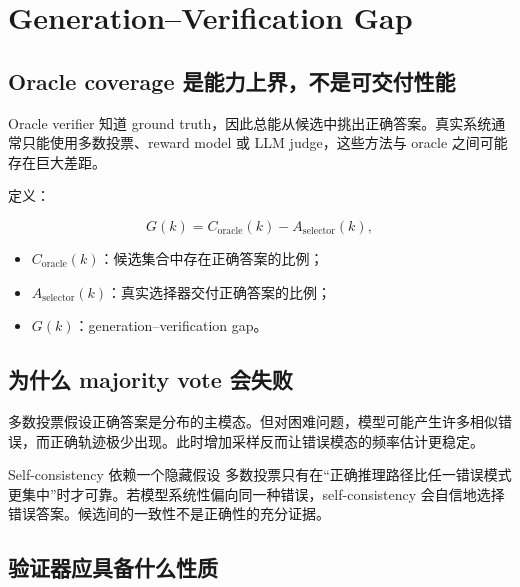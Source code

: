 \section{Generation--Verification Gap}

\subsection{Oracle coverage 是能力上界，不是可交付性能}

Oracle verifier 知道 ground truth，因此总能从候选中挑出正确答案。真实系统通常只能使用多数投票、reward model 或 LLM judge，这些方法与 oracle 之间可能存在巨大差距。


定义：

$$
G(k)=C_{\mathrm{oracle}}(k)-A_{\mathrm{selector}}(k),
$$

\begin{itemize}
    \item $C_{\mathrm{oracle}}(k)$：候选集合中存在正确答案的比例；
    \item $A_{\mathrm{selector}}(k)$：真实选择器交付正确答案的比例；
    \item $G(k)$：generation--verification gap。
\end{itemize}

\subsection{为什么 majority vote 会失败}

多数投票假设正确答案是分布的主模态。但对困难问题，模型可能产生许多相似错误，而正确轨迹极少出现。此时增加采样反而让错误模态的频率估计更稳定。


\begin{warningbox}{Self-consistency 依赖一个隐藏假设}
多数投票只有在“正确推理路径比任一错误模式更集中”时才可靠。若模型系统性偏向同一种错误，self-consistency 会自信地选择错误答案。候选间的一致性不是正确性的充分证据。
\end{warningbox}

\subsection{验证器应具备什么性质}


